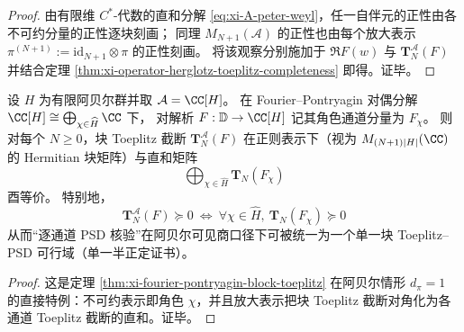 \begin{proof}
由有限维 \(C^\ast\)-代数的直和分解 \eqref{eq:xi-A-peter-weyl}，任一自伴元的正性由各不可约分量的正性逐块刻画；
同理 \(M_{N+1}(\mathcal{A})\) 的正性也由每个放大表示 \(\pi^{(N+1)}:=\mathrm{id}_{N+1}\otimes \pi\) 的正性刻画。
将该观察分别施加于 \(\Re F(w)\) 与 \(\mathbf{T}^{\mathcal{A}}_N(F)\) 并结合定理 \ref{thm:xi-operator-herglotz-toeplitz-completeness} 即得。证毕。
\end{proof}

\begin{corollary}\label{cor:xi-abelian-block-toeplitz-directsum}
设 \(H\) 为有限阿贝尔群并取 \(\mathcal{A}=\CC[H]\)。
在 Fourier--Pontryagin 对偶分解 \(\CC[H]\cong \bigoplus_{\chi\in\widehat H}\CC\) 下，
对解析 \(F:\mathbb{D}\to\CC[H]\) 记其角色通道分量为 \(F_\chi\)。
则对每个 \(N\ge 0\)，块 Toeplitz 截断 \(\mathbf{T}^{\mathcal{A}}_N(F)\) 在正则表示下（视为 \(M_{(N+1)|H|}(\CC)\) 的 Hermitian 块矩阵）与直和矩阵
\[
\bigoplus_{\chi\in\widehat H}\mathbf{T}_N(F_\chi)
\]
酉等价。
特别地，
\[
\boxed{\;
\mathbf{T}^{\mathcal{A}}_N(F)\succeq 0
\ \Longleftrightarrow\
\forall\chi\in\widehat H,\ \mathbf{T}_N(F_\chi)\succeq 0\;}
\]
从而“逐通道 PSD 核验”在阿贝尔可见商口径下可被统一为一个单一块 Toeplitz--PSD 可行域（单一半正定证书）。
\end{corollary}

\begin{proof}
这是定理 \ref{thm:xi-fourier-pontryagin-block-toeplitz} 在阿贝尔情形 \(d_\pi=1\) 的直接特例：不可约表示即角色 \(\chi\)，并且放大表示把块 Toeplitz 截断对角化为各通道 Toeplitz 截断的直和。证毕。
\end{proof}

